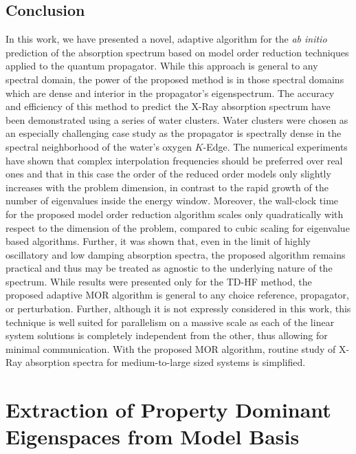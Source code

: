\subsection{Conclusion}
\label{sec:MORconclusion}
In this work, we have presented a novel, adaptive algorithm for the \emph{ab
initio} prediction of the absorption spectrum based on model order reduction
techniques applied to the quantum propagator. While this approach is general to
any spectral domain, the power of the proposed method is in those spectral
domains which are dense and interior in the propagator's eigenspectrum. The
accuracy and efficiency of this method to predict the X-Ray absorption spectrum
have been demonstrated using a series of water clusters. Water clusters were
chosen as an especially challenging case study as the propagator is spectrally
dense in the spectral neighborhood of the water's oxygen $K$-Edge. The
numerical experiments have shown that complex interpolation frequencies should
be preferred over real ones and that in this case the order of the reduced
order models only slightly increases with the problem dimension, in contrast to
the rapid growth of the number of eigenvalues inside the energy window.
Moreover, the wall-clock time for the proposed model order reduction algorithm scales
only quadratically with respect to the dimension of the problem,
compared to cubic scaling for eigenvalue based algorithms.
Further, it was shown that, even in the limit of highly oscillatory and low
damping absorption spectra, the proposed algorithm remains practical and thus
may be treated as agnostic to the underlying nature of the spectrum.
While results were presented only
for the TD-HF method, the proposed adaptive MOR algorithm is general to any
choice reference, propagator, or perturbation. Further, although it is not
expressly considered in this work, this technique is well suited for
parallelism on a massive scale as each of the linear system solutions is
completely independent from the other, thus allowing for minimal communication.
With the proposed MOR algorithm, routine study of X-Ray absorption spectra for
medium-to-large sized systems is simplified.

\section{Extraction of Property Dominant Eigenspaces from Model Basis}


